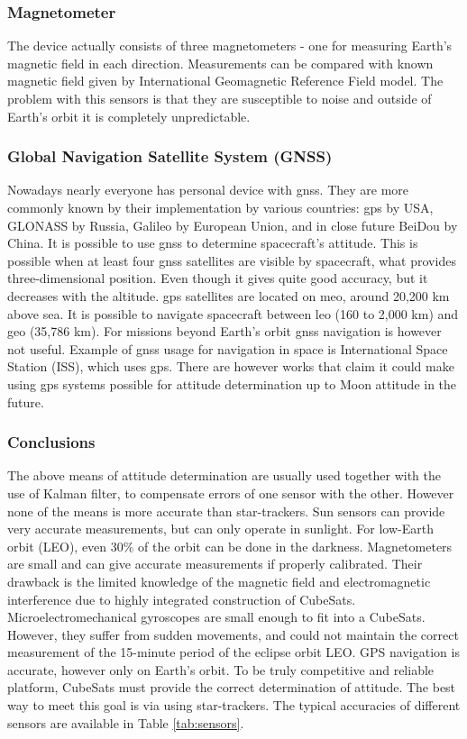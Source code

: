 \documentclass[12pt,a4paper,twoside]{article}
\begin{document}
\subsubsection{Magnetometer}
The device actually consists of three magnetometers - one for measuring Earth's magnetic field in each direction. Measurements can be compared with known magnetic field given by International Geomagnetic Reference Field model. The problem with this sensors is that they are susceptible to noise and outside of Earth's orbit it is completely unpredictable.
\subsubsection{Global Navigation Satellite System (GNSS)}
Nowadays nearly everyone has personal device with \gls{gnss}. They are more commonly known by their implementation by various countries: \gls{gps} by USA, GLONASS by Russia, Galileo by European Union, and in close future BeiDou by China. It is possible to use \gls{gnss} to determine spacecraft's attitude. This is possible when at least four \gls{gnss} satellites are visible by spacecraft, what provides three-dimensional position. Even though it gives quite good accuracy, but it decreases with the altitude. \gls{gps} satellites are located on \gls{meo}, around 20,200 km above sea\cite{gps-gov}. It is possible to navigate spacecraft between \gls{leo} (160 to 2,000 km) and \gls{geo} (35,786 km)\cite{nasa-gps-navigation}. For missions beyond Earth's orbit \gls{gnss} navigation is however not useful. Example of \gls{gnss} usage for navigation in space is International Space Station (ISS), which uses \gls{gps}.\cite{iss-gps} There are however works that claim it could make using \gls{gps} systems possible for attitude determination up to Moon attitude in the future\cite{capuano2014gnss}.

\subsubsection{Conclusions}
The above means of attitude determination are usually used together with the use of Kalman filter, to compensate errors of one sensor with the other. However none of the means is more accurate than star-trackers.
Sun sensors can provide very accurate measurements, but can only operate in sunlight. For low-Earth orbit (LEO), even 30\% of the orbit can be done in the darkness. Magnetometers are small and can give accurate measurements if properly calibrated. Their drawback is the limited knowledge of the magnetic field and electromagnetic interference due to highly integrated construction of CubeSats.
Microelectromechanical gyroscopes are small enough to fit into a CubeSats. However, they suffer from sudden movements, and could not maintain the correct measurement of the 15-minute period of the eclipse orbit LEO. GPS navigation is accurate, however only on Earth's orbit. To be truly competitive and reliable platform, CubeSats must provide the correct determination of attitude. The best way to meet this goal is via using star-trackers. The typical accuracies of different sensors are available in Table \ref{tab:sensors}.
\end{document}
